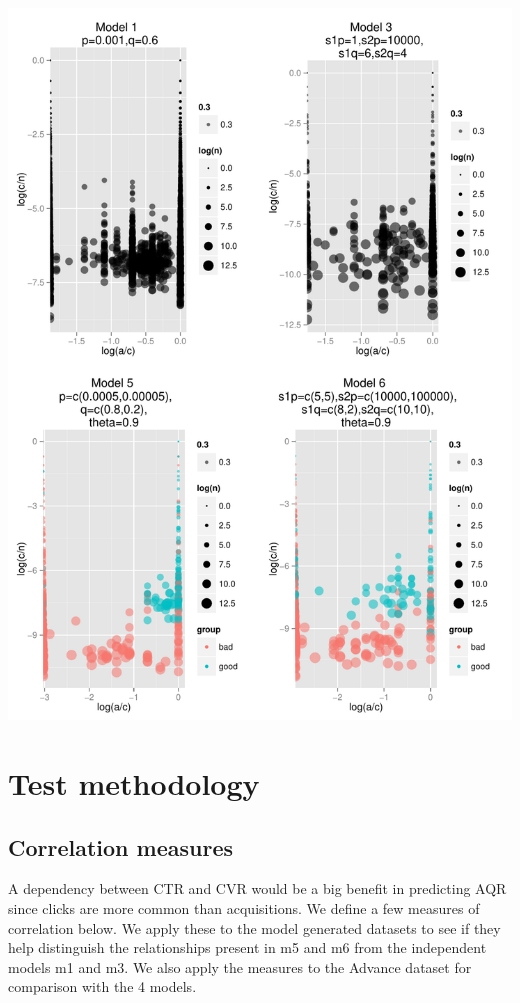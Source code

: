 \documentclass[11pt,a4,singlespacing,titlepagenumber=on]{scrreprt}
\numberwithin{equation}{chapter} %
\theoremstyle{remark}
\begin{document}
\includegraphics[scale=0.7]{SynthData}

\section{Test methodology} 

\subsection{ Correlation measures}

A dependency between CTR and CVR would be a big benefit in predicting AQR since clicks are more common than acquisitions. We define a few measures of correlation below. We apply these to the model generated datasets to see if they help distinguish the relationships present in m5 and m6 from the independent models m1 and m3. We also apply the measures to the Advance dataset for comparison with the 4 models.
\end{document}
